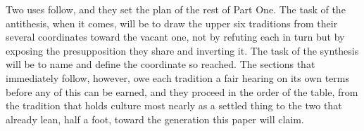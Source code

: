Two uses follow, and they set the plan of the rest of Part One. The task of the antithesis, when it comes, will be to draw the upper six traditions from their several coordinates toward the vacant one, not by refuting each in turn but by exposing the presupposition they share and inverting it. The task of the synthesis will be to name and define the coordinate so reached. The sections that immediately follow, however, owe each tradition a fair hearing on its own terms before any of this can be earned, and they proceed in the order of the table, from the tradition that holds culture most nearly as a settled thing to the two that already lean, half a foot, toward the generation this paper will claim.
